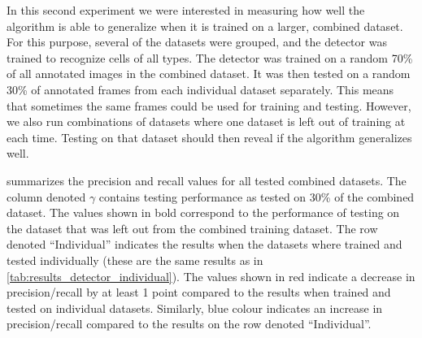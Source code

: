 		In this second experiment we were interested in measuring how well the algorithm is able to generalize when it is trained on a larger, combined dataset. For this purpose, several of the datasets were grouped, and the detector was trained to recognize cells of all types. The detector was trained on a random 70\% of all annotated images in the combined dataset. It was then tested on a random 30\% of annotated frames from each individual dataset separately. This means that sometimes the same frames could be used for training and testing. However, we also run combinations of datasets where one dataset is left out of training at each time. Testing on that dataset should then reveal if the algorithm generalizes well.
		
		 summarizes the precision and recall values for all tested combined datasets. The column denoted $\gamma$ contains testing performance as tested on 30\% of the combined dataset. The values shown in bold correspond to the performance of testing on the dataset that was left out from the combined training dataset. The row denoted ``Individual'' indicates the results when the datasets where trained and tested individually (these are the same results as in \cref{tab:results_detector_individual}). The values shown in red indicate a decrease in precision/recall by at least 1 point compared to the results when trained and tested on individual datasets. Similarly, blue colour indicates an increase in precision/recall compared to the results on the row denoted ``Individual''.
		
